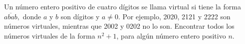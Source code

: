 Un número entero positivo de cuatro dígitos se llama virtual si tiene la forma $\overline{abab},$ donde $a$ y $b$ son dígitos y $a \neq 0$. Por ejemplo, 2020, 2121 y 2222 son números virtuales, mientras que 2002 y 0202 no lo son. Encontrar todos los números virtuales de la forma $n^2+1$, para algún número entero positivo $n$.
